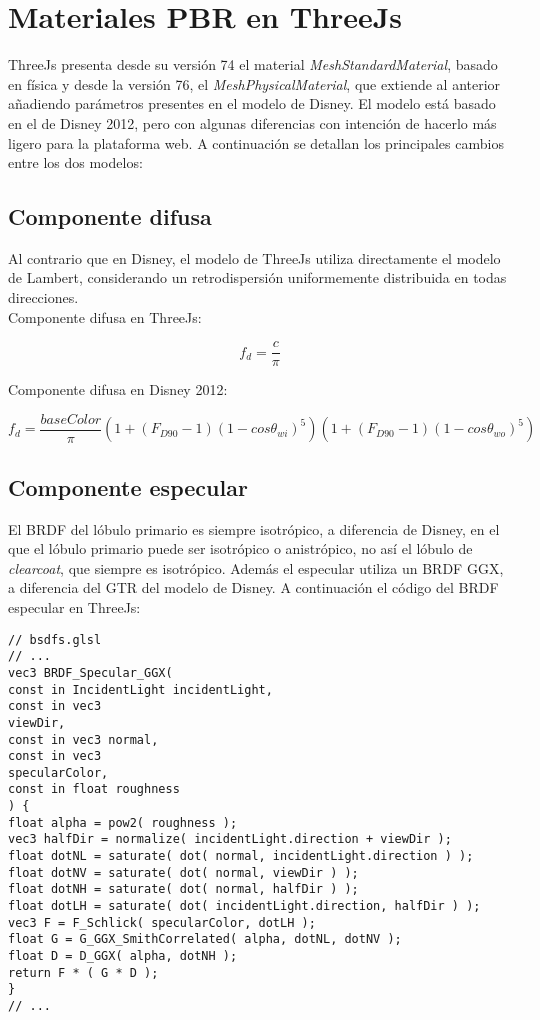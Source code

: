 \section{Materiales PBR en ThreeJs}

ThreeJs presenta desde su versi\'on 74 el material \textit{MeshStandardMaterial}, basado en f\'isica y desde la versi\'on
76, el \textit{MeshPhysicalMaterial}, que extiende al anterior a\~nadiendo par\'ametros presentes en el modelo de Disney.
El modelo est\'a basado en el de Disney 2012, pero con algunas diferencias con intenci\'on de hacerlo m\'as ligero
para la plataforma web. A continuaci\'on se detallan los principales cambios entre los dos modelos:

  \subsection{Componente difusa}
  Al contrario que en Disney, el modelo de ThreeJs utiliza directamente el modelo de Lambert, considerando un retrodispersi\'on
  uniformemente distribuida en todas direcciones.\\

  Componente difusa en ThreeJs:

  \begin{equation}
    f_d = \frac{c}{\pi}
  \end{equation}
  \singlespacing

  Componente difusa en Disney 2012:

  \begin{equation}
    f_d = \frac{baseColor}{\pi}
    \left(  1 + (F_{D90} - 1)(1 - cos\theta_{wi})^5  \right)
    \left(  1 + (F_{D90} - 1)(1 - cos\theta_{wo})^5  \right)
  \end{equation}
  \singlespacing


  \subsection{Componente especular}
  El BRDF del l\'obulo primario es siempre isotr\'opico, a diferencia de Disney, en el que el l\'obulo primario
  puede ser isotr\'opico o anistr\'opico, no as\'i el l\'obulo de \textit{clearcoat}, que siempre es isotr\'opico.
  Adem\'as el especular utiliza un BRDF GGX, a diferencia del GTR del modelo de Disney. A continuaci\'on el c\'odigo
  del BRDF especular en ThreeJs:

  \singlespacing
  \begin{lstlisting}[caption=Clase MeshClothMaterial]
// bsdfs.glsl
// ...
vec3 BRDF_Specular_GGX(
const in IncidentLight incidentLight,
const in vec3
viewDir,
const in vec3 normal,
const in vec3
specularColor,
const in float roughness
) {
float alpha = pow2( roughness );
vec3 halfDir = normalize( incidentLight.direction + viewDir );
float dotNL = saturate( dot( normal, incidentLight.direction ) );
float dotNV = saturate( dot( normal, viewDir ) );
float dotNH = saturate( dot( normal, halfDir ) );
float dotLH = saturate( dot( incidentLight.direction, halfDir ) );
vec3 F = F_Schlick( specularColor, dotLH );
float G = G_GGX_SmithCorrelated( alpha, dotNL, dotNV );
float D = D_GGX( alpha, dotNH );
return F * ( G * D );
}
// ...
  \end{lstlisting}
  \singlespacing

